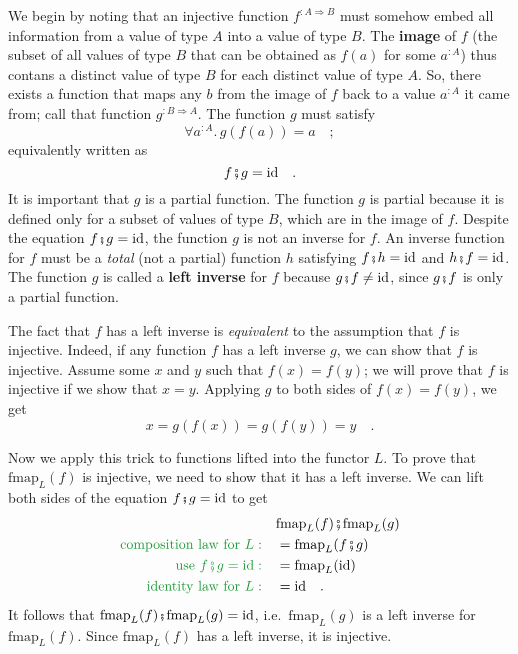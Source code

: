 We begin by noting that an injective function $f^{:A\Rightarrow B}$
must somehow embed all information from a value of type $A$ into
a value of type $B$. The \textbf{image} of $f$ (the subset of all
values of type $B$ that can be obtained as $f(a)$ for some $a^{:A}$)
thus contans a distinct value of type $B$ for each distinct value
of type $A$. So, there exists a function that maps any $b$ from
the image of $f$ back to a value $a^{:A}$ it came from; call that
function $g^{:B\Rightarrow A}$. The function $g$ must satisfy 
\[
\forall a^{:A}.\,g(f(a))=a\quad;
\]
equivalently written as 
\[
f\bef g=\text{id}\quad.
\]
It is important that $g$ is a partial function.
The function $g$ is partial because it is defined only for a subset
of values of type $B$, which are in the image of $f$. Despite the
equation $f\bef g=\text{id}$, the function $g$ is not an inverse
for $f$. An inverse function for $f$ must
be a \emph{total} (not a partial) function $h$ satisfying $f\bef h=\text{id}$
and $h\bef f=\text{id}$. The function $g$ is called a \textbf{left
inverse} for $f$ because $g\bef f\neq\text{id}$,
since $g\bef f$ is only a partial function.

The fact that $f$ has a left inverse is \emph{equivalent} to the
assumption that $f$ is injective. Indeed, if any function $f$ has
a left inverse $g$, we can show that $f$ is injective. Assume some
$x$ and $y$ such that $f(x)=f(y)$; we will prove that $f$ is injective
if we show that $x=y$. Applying $g$ to both sides of $f(x)=f(y)$,
we get
\[
x=g(f(x))=g(f(y))=y\quad.
\]

Now we apply this trick to functions lifted into the functor $L$.
To prove that $\text{fmap}_{L}(f)$ is injective, we need to show
that it has a left inverse. We can lift both sides of the equation
$f\bef g=\text{id}$ to get
\begin{align*}
 & \text{fmap}_{L}(f)\bef\text{fmap}_{L}(g)\\
{\color{greenunder}\text{composition law for }L:}\quad & =\text{fmap}_{L}(f\bef g)\\
{\color{greenunder}\text{use }f\bef g=\text{id}:}\quad & =\text{fmap}_{L}(\text{id})\\
{\color{greenunder}\text{identity law for }L:}\quad & =\text{id}\quad.
\end{align*}
It follows that $\text{fmap}_{L}(f)\bef\text{fmap}_{L}(g)=\text{id}$,
i.e.~$\text{fmap}_{L}(g)$ is a left inverse for $\text{fmap}_{L}(f)$.
Since $\text{fmap}_{L}(f)$ has a left inverse, it is injective.


